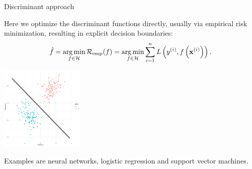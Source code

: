\documentclass[11pt,compress,t,notes=noshow, xcolor=table]{beamer}
\begin{document}
\begin{vbframe}{Discriminant approach}

Here we optimize the discriminant functions directly, usually via empirical risk minimization, resulting in explicit decision boundaries:
$$ \hat{f} = \operatorname*{arg\,min}_{f \in \mathcal{H}} \mathcal{R}_{\text{emp}}(f) = \operatorname*{arg\,min}_{f \in \mathcal{H}} \sum\limits_{i=1}^n L\left(y^{(i)}, f\left(\mathbf{x}^{(i)}\right)\right).$$

\begin{center}
\includegraphics[width=0.3\textwidth]{figure/approach_discriminant.png} 
\end{center}

\small{
Examples are neural networks, logistic regression and support vector machines.
}

\end{vbframe}

\endlecture
\end{document}
